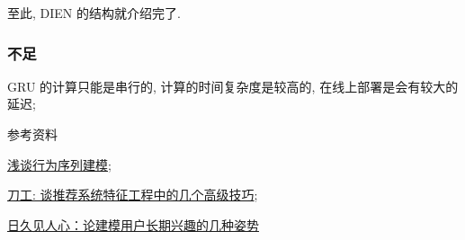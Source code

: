 至此, DIEN 的结构就介绍完了.

\subsubsection{不足}
\begin{myitemize}
	\item GRU 的计算只能是串行的, 计算的时间复杂度是较高的, 在线上部署是会有较大的延迟;
\end{myitemize}


参考资料
\begin{myitemize}
	\item \href{https://mp.weixin.qq.com/s?__biz=MzU0MDA1MzI0Mw==&mid=2247488129&idx=1&sn=ed882611a06b75e8e819b519010e9e81&chksm=fb3e4915cc49c003cb4505d0b09f06fa1c4e92409270b49f5509f1902774234382ba05b400d8&scene=21#wechat_redirect}{浅谈行为序列建模};
	
	\item \href{https://mp.weixin.qq.com/s?__biz=MzI5NTU2ODQzMg==&mid=2247484150&idx=1&sn=3bdb017a542bc2e2b94404f46ec9eb4f&chksm=ec50d7a9db275ebfdc009e6be3ea6a0ee8209477dafc99bc8a6a212fa0456a14bf4453b826dd&scene=21#wechat_redirect}{刀工: 谈推荐系统特征工程中的几个高级技巧};
	
	\item \href{https://mp.weixin.qq.com/s/o04b8gN4TYecKHopXGMuVg}{日久见人心：论建模用户长期兴趣的几种姿势}
\end{myitemize}